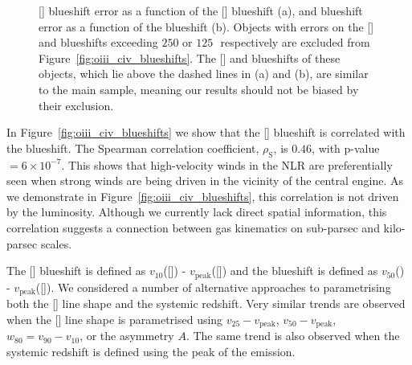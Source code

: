 \begin{figure}
\captionsetup[subfigure]{labelformat=empty}
\centering
    \subfloat[\label{fig:oiii_civ_blueshifts_a}]{}
    \subfloat[\label{fig:oiii_civ_blueshifts_b}]{}
    \caption[{Objects excluded from Figure~\ref{fig:oiii_civ_blueshifts}.}]{[] blueshift error as a function of the [] blueshift (a), and  blueshift error as a function of the  blueshift (b). Objects with errors on the [] and  blueshifts exceeding $250$ or $125$\,\kms\, respectively are excluded from Figure~\ref{fig:oiii_civ_blueshifts}. The [] and  blueshifts of these objects, which lie above the dashed lines in (a) and (b), are similar to the main sample, meaning our results should not be biased by their exclusion.}
    \label{fig:oiii_civ_blueshifts_flagged}
\end{figure}

In Figure~\ref{fig:oiii_civ_blueshifts} we show that the [] blueshift is correlated with the  blueshift.
The Spearman correlation coefficient, $\rho_{\text{S}}$, is $0.46$, with p-value $=6\times10^{-7}$.
This shows that high-velocity winds in the NLR are preferentially seen when strong winds are being driven in the vicinity of the central engine.
As we demonstrate in Figure~\ref{fig:oiii_civ_blueshifts}, this correlation is not driven by the luminosity.
Although we currently lack direct spatial information, this correlation suggests a connection between gas kinematics on sub-parsec and kilo-parsec scales.

The [] blueshift is defined as $v_{10}$([]) - $v_{\text{peak}}$([]) and the  blueshift is defined as $v_{50}$() - $v_{\text{peak}}$([]).
We considered a number of alternative approaches to parametrising both the [] line shape and the systemic redshift.
Very similar trends are observed when the [] line shape is parametrised using $v_{25} - v_{\text{peak}}$, $v_{50} - v_{\text{peak}}$, $w_{80} = v_{90} - v_{10}$, or the asymmetry $A$.
The same trend is also observed when the systemic redshift is defined using the peak of the \hb emission.

